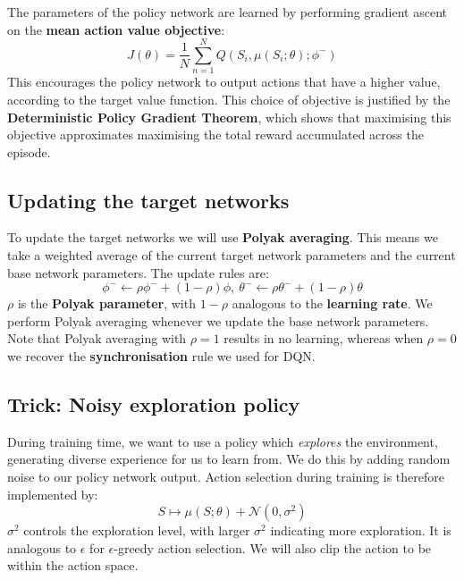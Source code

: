\documentclass[]{article}
\begin{document}
The parameters of the policy network are learned by performing gradient ascent on the \textbf{mean action value objective}:
\begin{equation}\label{eq:objective function for policy network}
	J(\theta) = \frac{1}{N} \sum_{n=1}^N Q(S_i, \mu(S_i;\theta); \phi^-) 
\end{equation}
This encourages the policy network to output actions that have a higher value, according to the target value function. This choice of objective is justified by the \textbf{Deterministic Policy Gradient Theorem}, which shows that maximising this objective approximates maximising the total reward accumulated across the episode. 

\subsection*{Updating the target networks}
To update the target networks we will use \textbf{Polyak averaging}. This means we take a weighted average of the current target network parameters and the current base network parameters. The update rules are:
\begin{equation}\label{eq:Polyak averaging}
	\phi^- \gets \rho \phi^- + (1 - \rho)\phi,~\theta^- \gets \rho \theta^- + (1 - \rho)\theta
\end{equation}
$\rho$ is the \textbf{Polyak parameter}, with $1 - \rho$ analogous to the \textbf{learning rate}. We perform Polyak averaging whenever we update the base network parameters. Note that Polyak averaging with $\rho = 1$ results in no learning, whereas when $\rho = 0$ we recover the \textbf{synchronisation} rule we used for DQN. 

\subsection*{Trick: Noisy exploration policy}
During training time, we want to use a policy which \emph{explores} the environment, generating diverse experience for us to learn from. We do this by adding random noise to our policy network output. Action selection during training is therefore implemented by:
\begin{equation}\label{eq:noisy exploration policy}
	S \mapsto \mu(S;\theta) + \mathcal{N}(0, \sigma^2)
\end{equation}
$\sigma^2$ controls the exploration level, with larger $\sigma^2$ indicating more exploration. It is analogous to $\epsilon$ for $\epsilon$-greedy action selection. We will also clip the action to be within the action space. 
\end{document}
